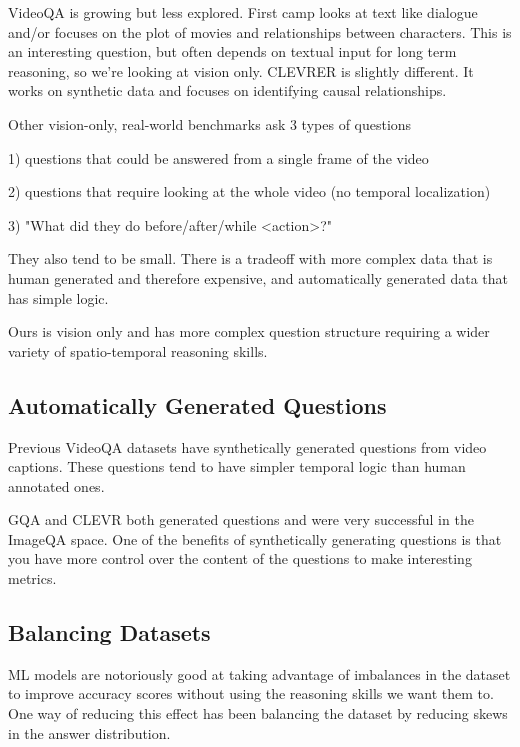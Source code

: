 \documentclass[10pt,twocolumn,letterpaper]{article}
\newcommand{\mgm}[1]{{\color{cyan}{mgm: #1}}}
\begin{document}
VideoQA is growing but less explored. First camp looks at text like dialogue and/or focuses on the plot of movies and relationships between characters. This is an interesting question, but often depends on textual input for long term reasoning, so we're looking at vision only. 
CLEVRER is slightly different. It works on synthetic data and focuses on identifying causal relationships. 

Other vision-only, real-world benchmarks ask 3 types of questions 

1) questions that could be answered from a single frame of the video

2) questions that require looking at the whole video (no temporal localization)

3) "What did they do before/after/while <action>?"

They also tend to be small. There is a tradeoff with more complex data that is human generated and therefore expensive, and automatically generated data that has simple logic. 

Ours is vision only and has more complex question structure requiring a wider variety of spatio-temporal reasoning skills. 



\subsection{Automatically Generated Questions}

\mgm{Highly considering taking this section out}

Previous VideoQA datasets have synthetically generated questions from video captions. These questions tend to have simpler temporal logic than human annotated ones. 

GQA and CLEVR both generated questions and were very successful in the ImageQA space. One of the benefits of synthetically generating questions is that you have more control over the content of the questions to make interesting metrics. 

\subsection{Balancing Datasets}
ML models are notoriously good at taking advantage of imbalances in the dataset to improve accuracy scores without using the reasoning skills we want them to. One way of reducing this effect has been balancing the dataset by reducing skews in the answer distribution. 
\end{document}
